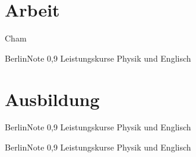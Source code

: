 \documentclass[12pt,ngerman]{moderncv}
\begin{document}
\maketitle

\section{Arbeit}

{
{Cham}{}{}}{}

{Berlin}{Note 0,9}
{Leistungskurse Physik und Englisch}


\section{Ausbildung}

{Berlin}{Note 0,9}
{Leistungskurse Physik und Englisch}

{Berlin}{Note 0,9}
{Leistungskurse Physik und Englisch}
\end{document}
